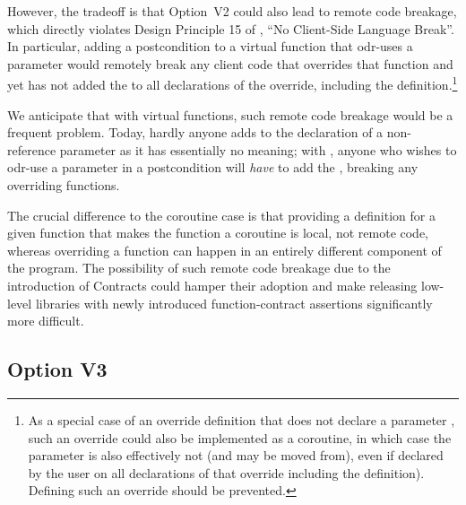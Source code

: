 However, the tradeoff is that Option~V2 could also lead to remote code breakage, which directly violates Design Principle 15 of \cite{P2900R10}, ``No Client-Side Language Break''. In particular, adding a postcondition to a virtual function that odr-uses a  parameter would remotely break any client code that overrides that function and yet has not added the  to all declarations of the override, including the definition.\footnote{As a special
case of an override definition that does not declare a parameter , such an override could also be implemented as a coroutine, in which case the parameter is also effectively not  (and may be moved from), even if declared  by the user on all declarations of that override including the definition). Defining such an override should be prevented.}

We anticipate that with virtual functions, such remote code breakage would be a frequent problem. Today, hardly anyone adds  to the declaration of a non-reference parameter as it has essentially no meaning; with \cite{P2900R10}, anyone who wishes to odr-use a parameter in a postcondition will \emph{have} to add the , breaking any overriding functions.

The crucial difference to the coroutine case is that providing a definition for a given function that makes the function a coroutine is local, not remote code, whereas overriding a function can happen in an entirely different component of the program. The possibility of such remote code breakage due to the introduction of Contracts could hamper their adoption and make releasing low-level libraries with newly introduced function-contract assertions significantly more difficult.

\subsection*{Option V3}

